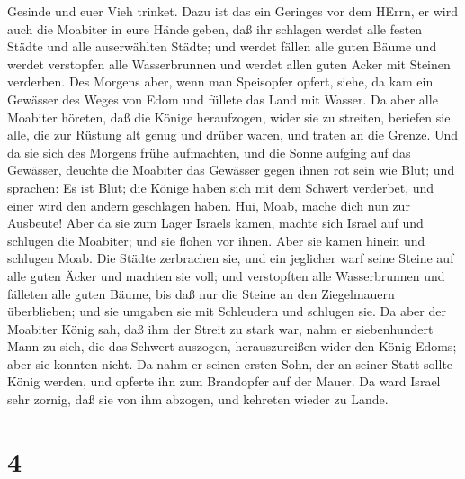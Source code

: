 Gesinde und euer Vieh trinket.  Dazu ist das ein Geringes
vor dem HErrn, er wird auch die Moabiter in eure Hände geben,
 daß ihr schlagen werdet alle festen Städte und alle
auserwählten Städte; und werdet fällen alle guten Bäume und werdet
verstopfen alle Wasserbrunnen und werdet allen guten Acker mit Steinen
verderben.  Des Morgens aber, wenn man Speisopfer opfert,
siehe, da kam ein Gewässer des Weges von Edom und füllete das Land mit
Wasser.  Da aber alle Moabiter höreten, daß die Könige
heraufzogen, wider sie zu streiten, beriefen sie alle, die zur Rüstung
alt genug und drüber waren, und traten an die Grenze.  Und
da sie sich des Morgens frühe aufmachten, und die Sonne aufging auf das
Gewässer, deuchte die Moabiter das Gewässer gegen ihnen rot sein wie
Blut;  und sprachen: Es ist Blut; die Könige haben sich mit
dem Schwert verderbet, und einer wird den andern geschlagen haben. Hui,
Moab, mache dich nun zur Ausbeute!  Aber da sie zum Lager
Israels kamen, machte sich Israel auf und schlugen die Moabiter; und sie
flohen vor ihnen. Aber sie kamen hinein und schlugen Moab. 
Die Städte zerbrachen sie, und ein jeglicher warf seine Steine auf alle
guten Äcker und machten sie voll; und verstopften alle Wasserbrunnen und
fälleten alle guten Bäume, bis daß nur die Steine an den Ziegelmauern
überblieben; und sie umgaben sie mit Schleudern und schlugen sie.
 Da aber der Moabiter König sah, daß ihm der Streit zu
stark war, nahm er siebenhundert Mann zu sich, die das Schwert auszogen,
herauszureißen wider den König Edoms; aber sie konnten nicht.
 Da nahm er seinen ersten Sohn, der an seiner Statt sollte
König werden, und opferte ihn zum Brandopfer auf der Mauer. Da ward
Israel sehr zornig, daß sie von ihm abzogen, und kehreten wieder zu
Lande.

\hypertarget{section-3}{%
\section{4}\label{section-3}}

